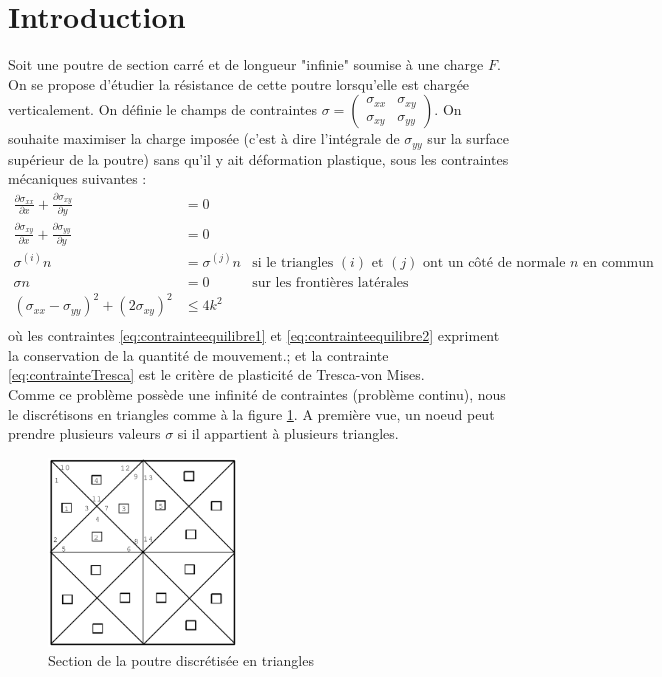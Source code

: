 \section*{Introduction}
Soit une poutre de section carré et de longueur "infinie" soumise à une charge $F$. On se propose d'étudier la résistance de cette poutre lorsqu'elle est chargée verticalement. On définie le champs de contraintes $\sigma = \begin{pmatrix}
\sigma_{xx} & \sigma_{xy}\\
\sigma_{xy} & \sigma_{yy}
\end{pmatrix}$. On souhaite maximiser la charge imposée (c'est à dire l'intégrale de $\sigma_{yy}$ sur la surface supérieur de la poutre) sans qu'il y ait déformation plastique, sous les contraintes mécaniques suivantes : 
\begin{align}
\frac{\partial \sigma_{xx}}{\partial x} + \frac{\partial \sigma_{xy}}{\partial y} &= 0 \label{eq:contrainteequilibre1}\\
\frac{\partial \sigma_{xy}}{\partial x} + \frac{\partial \sigma_{yy}}{\partial y} &= 0\label{eq:contrainteequilibre2}\\
\sigma^{(i)}n &= \sigma^{(j)}n & \text{si le triangles $(i)$ et $(j)$ ont un côté de normale $n$ en commun} \label{eq:contrainteContinuite}\\
\sigma n &= 0 & \text{sur les frontières latérales} \label{eq:contrainteFrontiere} \\
(\sigma_{xx} - \sigma_{yy})^2 + (2 \sigma_{xy})^2 & \leq 4 k^2 \label{eq:contrainteTresca}\\
\end{align}
où les contraintes \eqref{eq:contrainteequilibre1} et \eqref{eq:contrainteequilibre2} expriment la conservation de la quantité de mouvement.; et la contrainte \eqref{eq:contrainteTresca} est le critère de plasticité de Tresca-von Mises. \\
Comme ce problème possède une infinité de contraintes (problème continu), nous le discrétisons en triangles comme à la figure \ref{fig:discretisation}. A première vue, un noeud peut prendre plusieurs valeurs $\sigma$ si il appartient à plusieurs triangles. 

\begin{figure}
\centering
\includegraphics[height=5cm]{images/discretisation.png}
\caption{Section de la poutre discrétisée en triangles}
\label{fig:discretisation}
\end{figure}


